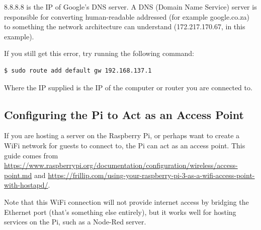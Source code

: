 8.8.8.8 is the IP of Google's DNS server. A DNS (Domain Name Service) server is responsible for converting human-readable addressed (for example google.co.za) to something the network architecture can understand (172.217.170.67, in this example).

If you still get this error, try running the following command:
\begin{lstlisting}
$ sudo route add default gw 192.168.137.1
\end{lstlisting}
Where the IP supplied is the IP of the computer or router you are connected to.

\subsection{Configuring the Pi to Act as an Access Point}
If you are hosting a server on the Raspberry Pi, or perhaps want to create a WiFi network for guests to connect to, the Pi can act as an access point. This guide comes from \href{https://www.raspberrypi.org/documentation/configuration/wireless/access-point.md}{https://www.raspberrypi.org/documentation/configuration/wireless/access-point.md} and \href{https://frillip.com/using-your-raspberry-pi-3-as-a-wifi-access-point-with-hostapd/}{https://frillip.com/using-your-raspberry-pi-3-as-a-wifi-access-point-with-hostapd/}. 

Note that this WiFi connection will not provide internet access by bridging the Ethernet port (that's something else entirely), but it works well for hosting services on the Pi, such as a Node-Red server.

